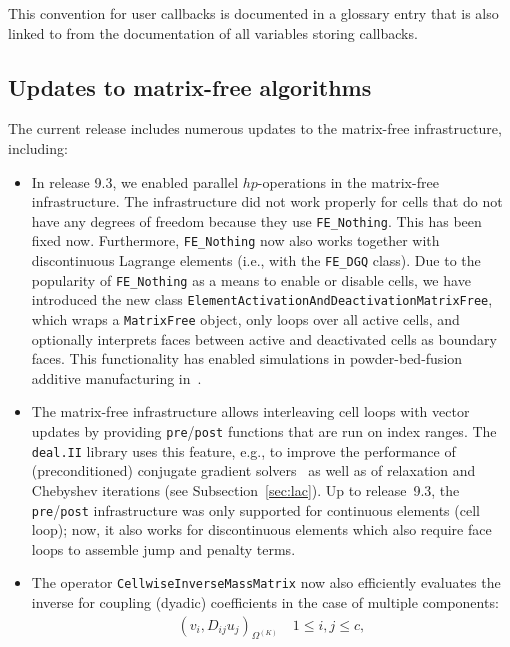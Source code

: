 \documentclass{ansarticle-preprint}
\newcommand{\specialword}[1]{\texttt{#1}}
\newcommand{\dealii}{{\specialword{deal.II}}\xspace}
\begin{document}
This convention for user callbacks is documented in a glossary entry
that is also linked to from the documentation of all variables storing
callbacks.


\subsection{Updates to matrix-free algorithms}\label{sec:mf}

The current release includes numerous updates to the matrix-free
infrastructure, including:
\begin{itemize}
\item In release 9.3, we enabled parallel $hp$-operations in the matrix-free infrastructure.
The infrastructure did not work properly for cells
that do not have any degrees of freedom because they use \texttt{FE\_Nothing}. This has been
fixed now. Furthermore, \texttt{FE\_Nothing} now also works together
with discontinuous Lagrange elements (i.e., with the \texttt{FE\_DGQ} class). Due to the popularity of \texttt{FE\_Nothing} as a means to enable
or disable cells, we have introduced the new class
\texttt{ElementActivationAndDeactivationMatrixFree}, which wraps a \texttt{MatrixFree} object, only loops over all
active cells, and optionally interprets faces between active and deactivated cells
as boundary faces. This functionality has enabled simulations in powder-bed-fusion additive
manufacturing in~\cite{proell2023highly}.
\item The matrix-free infrastructure allows interleaving cell loops with vector updates
  by providing \texttt{pre}/\texttt{post} functions that are run on index ranges.  The \dealii
  library uses this feature, e.g., to improve the performance of (preconditioned)
conjugate gradient solvers~\cite{kronbichler2022cg} as well as of relaxation and Chebyshev iterations (see Subsection~\ref{sec:lac}).
Up to release~9.3, the \texttt{pre}/\texttt{post} infrastructure was only supported for
continuous elements (cell loop); now, it also works for discontinuous
elements which also require face loops to assemble jump and penalty terms.
\item The operator \texttt{CellwiseInverseMassMatrix} now also efficiently
evaluates the inverse for coupling (dyadic) coefficients in the case of multiple
components:
\begin{align*}
\left(v_i, D_{ij} u_j  \right)_{\Omega^{(K)}}
\quad  1\le i,j \le c,
\end{align*}

\end{itemize}
\end{document}

